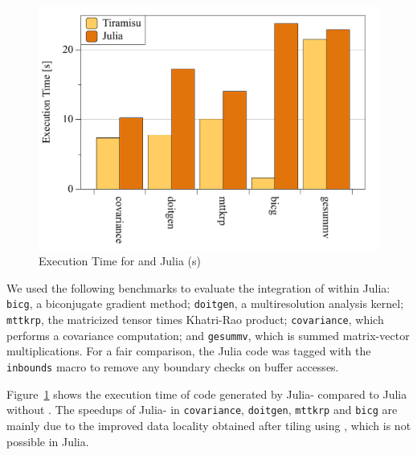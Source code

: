 \begin{figure}
\centering
 \includegraphics[width=0.8\columnwidth]{./figures/tiramisu_vs_julia}
 \caption{Execution Time for \framework and Julia (s)}
 \label{fig:speedup_julia}
 \vspace{-0.5cm}
\end{figure}

We used the following benchmarks to evaluate the integration of \framework within Julia: \texttt{bicg}, a biconjugate gradient method;  \texttt{doitgen}, a multiresolution analysis kernel;  \texttt{mttkrp}, the matricized tensor times Khatri-Rao product; \texttt{covariance}, which performs a covariance computation; and \texttt{gesummv}, which is summed matrix-vector multiplications.
For a fair comparison, the Julia code was tagged with the \texttt{inbounds} macro to remove any boundary checks on buffer accesses. 

Figure~\ref{fig:speedup_julia} shows the execution time of code generated by Julia-\framework{} compared to Julia without \framework{}.  The speedups of Julia-\framework{} in \texttt{covariance}, \texttt{doitgen}, \texttt{mttkrp} and \texttt{bicg} are mainly due to the improved data locality obtained after tiling using \framework{}, which is not possible in Julia.
